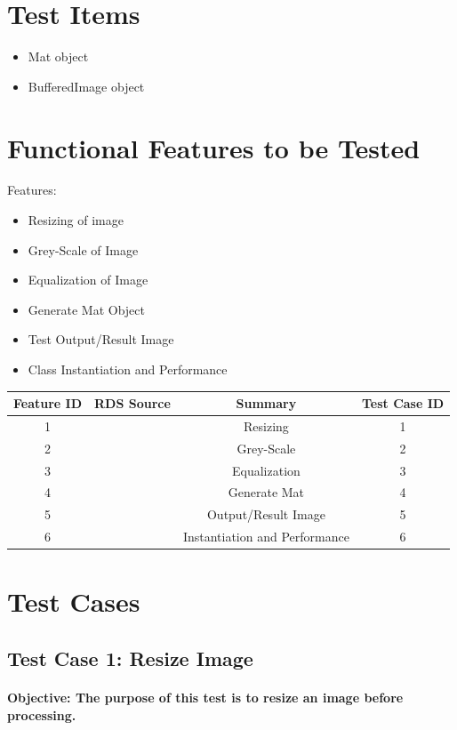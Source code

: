 \documentclass[a4paper,12pt]{report}
\begin{document}
\section {Test Items}		
	\begin{itemize}
		\item Mat object
		\item BufferedImage object 
	\end{itemize}

\section {Functional Features to be Tested}
\label{sec:Features}
	Features:
	\begin{itemize}
		\item Resizing of image
		\item Grey-Scale of Image
		\item Equalization of Image
		\item Generate Mat Object
		\item Test Output/Result Image
		\item Class Instantiation and Performance		
	\end{itemize}

	\begin{center}
	\begin{tabular}{ || c | c | c | c ||}
		\hline
		Feature ID & RDS Source & Summary & Test Case ID \\[1ex]
		\hline\hline
		1 &  & Resizing & 1 \\
		2 &  & Grey-Scale & 2\\
		3 &  & Equalization & 3\\
		4 &  & Generate Mat & 4\\
		5 &  & Output/Result Image & 5\\
		6 &  & Instantiation and Performance & 6\\
		\hline
	\end{tabular}
	\end{center}

\newpage
\section{Test Cases}
\label{sec:Cases}
	\subsection{Test Case 1: Resize Image}
	\paragraph{Objective: The purpose of this test is to resize an image before processing.}
\end{document}
